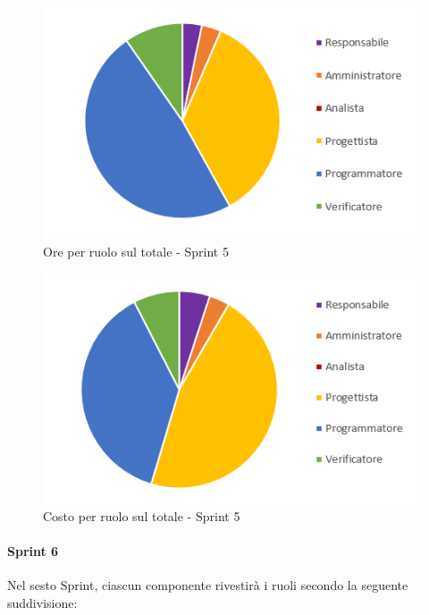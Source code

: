 \begin{figure}[H]
  \centering
  \includegraphics[scale=0.8]{immagini/5Sprint_oreRuolo.png}
  \caption{Ore per ruolo sul totale - Sprint 5}
\end{figure}

\begin{figure}[H]
  \centering
  \includegraphics[scale=0.8]{immagini/5Sprint_costoRuolo.png}
  \caption{Costo per ruolo sul totale - Sprint 5}
\end{figure}
\pagebreak


\paragraph{Sprint 6}
Nel sesto Sprint\glo{}, ciascun componente rivestirà i ruoli secondo la seguente suddivisione:

